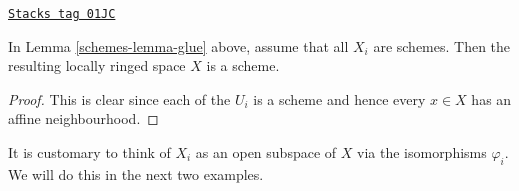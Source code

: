 \begin{lemma}
\label{schemes-lemma-glue-schemes}
\href{https://stacks.math.columbia.edu/tag/01JC}{\texttt{Stacks tag 01JC}}


In Lemma \ref{schemes-lemma-glue} above, assume that all
$X_i$ are schemes. Then the resulting locally ringed
space $X$ is a scheme.
\end{lemma}

\begin{proof}
This is clear since each of the $U_i$ is a scheme
and hence every $x \in X$ has an affine neighbourhood.
\end{proof}

It is customary to think of $X_i$ as an open subspace of
$X$ via the isomorphisms $\varphi_i$. We will do this in
the next two examples.

